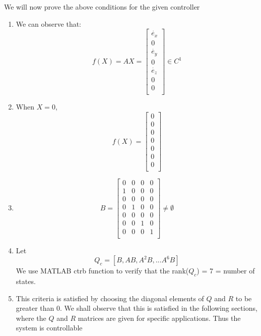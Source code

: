 \documentclass[conf]{new-aiaa}
\begin{document}
We will now prove the above conditions for the given controller
\begin{enumerate}
\item We can observe that:
\begin{equation}
f(X) = AX = \begin{bmatrix}
\dot{e_{x}}\\
0\\
\dot{e_{y}}\\
0\\
\dot{e_{z}}\\
0\\
0\\
\end{bmatrix} \in C^{1}
\end{equation}
\item When $X = 0$, 
\begin{equation}
f(X) = \begin{bmatrix}
0\\
0\\
0\\
0\\
0\\
0\\
0\\
\end{bmatrix}
\end{equation}
\item \begin{equation}
B = \begin{bmatrix}
0 & 0 & 0 & 0\\
1 & 0 & 0 & 0\\
0 & 0 & 0 & 0\\
0 & 1 & 0 & 0\\
0 & 0 & 0 & 0\\
0 & 0 & 1 & 0\\
0 & 0 & 0 & 1\\
\end{bmatrix} \neq \emptyset
\end{equation}
\item Let
\begin{equation}
Q_{c} = [B, AB, A^{2}B,...A^{6}B]
\end{equation}
We use MATLAB ctrb function to verify that the rank($Q_{c}$) = 7 = number of states.
\item This criteria is satisfied by choosing the diagonal elements of $Q$ and $R$ to be greater than 0. We shall observe that this is satisfied in the following sections, where the $Q$ and $R$ matrices are given for specific applications.
Thus the system is controllable
\end{enumerate}
\end{document}
